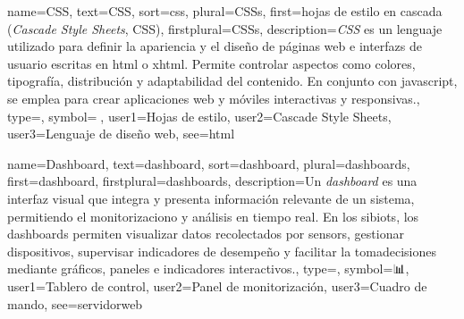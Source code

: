 	{
		name={CSS},
		text={CSS},
		sort={css},
		plural={CSSs},
		first={hojas de estilo en cascada (\textit{Cascade Style Sheets}, CSS)},
		firstplural={CSSs},
		description={\emph{CSS} es un lenguaje utilizado para definir la apariencia y el dise{\~n}o de p{\'a}ginas web e \glspl{interfaz} de usuario escritas en \gls{html} o \gls{xhtml}. Permite controlar aspectos como colores, tipograf{\'i}a, distribuci{\'o}n y adaptabilidad del contenido. En conjunto con \gls{javascript}, se emplea para crear aplicaciones web y m{\'o}viles interactivas y responsivas.},
		type=\glsdefaulttype,
		symbol={🎨},
		user1={Hojas de estilo},
		user2={Cascade Style Sheets},
		user3={Lenguaje de dise{\~n}o web},
		see={html}
	}
	
	{
		name={Dashboard},
		text={dashboard},
		sort={dashboard},
		plural={dashboards},
		first={dashboard},
		firstplural={dashboards},
		description={Un \textit{\emph{dashboard}} es una interfaz visual que integra y presenta informaci{\'o}n relevante de un \gls{sistema}, permitiendo el \gls{monitorizacion}o y an{\'a}lisis en tiempo real. En los \glspl{sibiot}, los dashboards permiten visualizar datos recolectados por \glspl{sensor}, gestionar \glspl{dispositivo}, supervisar indicadores de desempe{\~n}o y facilitar la \gls{tomadecisiones} mediante gr{\'a}ficos, paneles e indicadores interactivos.},
		type=\glsdefaulttype,
		symbol={📊},
		user1={Tablero de control},
		user2={Panel de monitorizaci{\'o}n},
		user3={Cuadro de mando},
		see={servidorweb}
	}
	
	
